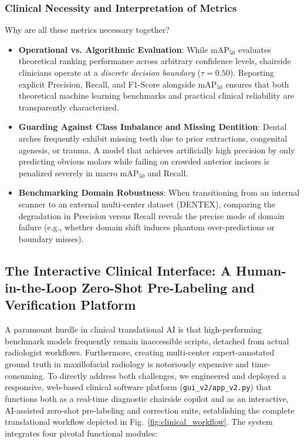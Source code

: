 \documentclass[10pt,journal,compsoc]{IEEEtran}
\begin{document}
\subsubsection{Clinical Necessity and Interpretation of Metrics}
Why are all these metrics necessary together?
\begin{itemize}
    \item \textbf{Operational vs. Algorithmic Evaluation}: While $\text{mAP}_{50}$ evaluates theoretical ranking performance across arbitrary confidence levels, chairside clinicians operate at a \textit{discrete decision boundary} ($\tau = 0.50$). Reporting explicit Precision, Recall, and F1-Score alongside $\text{mAP}_{50}$ ensures that both theoretical machine learning benchmarks and practical clinical reliability are transparently characterized.
    \item \textbf{Guarding Against Class Imbalance and Missing Dentition}: Dental arches frequently exhibit missing teeth due to prior extractions, congenital agenesis, or trauma. A model that achieves artificially high precision by only predicting obvious molars while failing on crowded anterior incisors is penalized severely in macro $\text{mAP}_{50}$ and Recall.
    \item \textbf{Benchmarking Domain Robustness}: When transitioning from an internal scanner to an external multi-center dataset (DENTEX), comparing the degradation in Precision versus Recall reveals the precise mode of domain failure (e.g., whether domain shift induces phantom over-predictions or boundary misses).
\end{itemize}

\subsection{The Interactive Clinical Interface: A Human-in-the-Loop Zero-Shot Pre-Labeling and Verification Platform}
A paramount hurdle in clinical translational AI is that high-performing benchmark models frequently remain inaccessible scripts, detached from actual radiologist workflows. Furthermore, creating multi-center expert-annotated ground truth in maxillofacial radiology is notoriously expensive and time-consuming. To directly address both challenges, we engineered and deployed a responsive, web-based clinical software platform (\texttt{gui\_v2/app\_v2.py}) that functions both as a real-time diagnostic chairside copilot and as an interactive, AI-assisted zero-shot pre-labeling and correction suite, establishing the complete translational workflow depicted in Fig.~\ref{fig:clinical_workflow}. The system integrates four pivotal functional modules:
\end{document}
